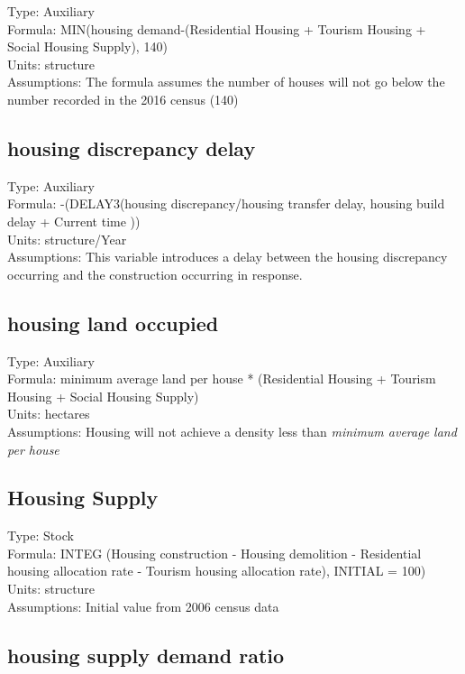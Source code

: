 \documentclass[
  11pt,
]{book}
\begin{document}
Type: Auxiliary\\
Formula: MIN(housing demand-(Residential Housing + Tourism Housing + Social Housing Supply), 140)\\
Units: structure\\
Assumptions: The formula assumes the number of houses will not go below the number recorded in the 2016 census (140)

\hypertarget{housing-discrepancy-delay}{%
\subsection{housing discrepancy delay}\label{housing-discrepancy-delay}}

Type: Auxiliary\\
Formula: -(DELAY3(housing discrepancy/housing transfer delay, housing build delay + Current time ))\\
Units: structure/Year\\
Assumptions: This variable introduces a delay between the housing discrepancy occurring and the construction occurring in response.

\hypertarget{housing-land-occupied}{%
\subsection{housing land occupied}\label{housing-land-occupied}}

Type: Auxiliary\\
Formula: minimum average land per house * (Residential Housing + Tourism Housing + Social Housing Supply)\\
Units: hectares\\
Assumptions: Housing will not achieve a density less than \emph{minimum average land per house}

\hypertarget{housing-supply}{%
\subsection{Housing Supply}\label{housing-supply}}

Type: Stock\\
Formula: INTEG (Housing construction - Housing demolition - Residential housing allocation rate - Tourism housing allocation rate), INITIAL = 100)\\
Units: structure\\
Assumptions: Initial value from 2006 census data

\hypertarget{housing-supply-demand-ratio}{%
\subsection{housing supply demand ratio}\label{housing-supply-demand-ratio}}
\end{document}
